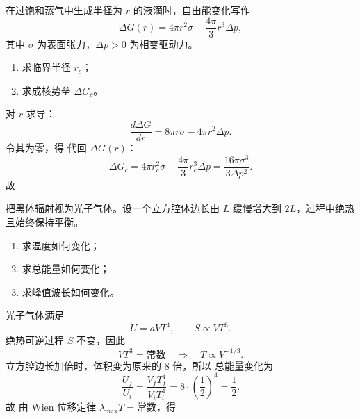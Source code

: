 \begin{question}
在过饱和蒸气中生成半径为 $r$ 的液滴时，自由能变化写作
\[
\Delta G(r)=4\pi r^2\sigma-\frac{4\pi}{3}r^3\Delta p,
\]
其中 $\sigma$ 为表面张力，$\Delta p>0$ 为相变驱动力。
\begin{enumerate}[label=（\arabic*）,leftmargin=2.8em,itemsep=0.2em]
\item 求临界半径 $r_c$；
\item 求成核势垒 $\Delta G_c$。
\end{enumerate}
\begin{solution}

对 $r$ 求导：
\[
\frac{d\Delta G}{dr}=8\pi r\sigma-4\pi r^2\Delta p.
\]
令其为零，得
代回 $\Delta G(r)$：
\[
\Delta G_c=4\pi r_c^2\sigma-\frac{4\pi}{3}r_c^3\Delta p
=\frac{16\pi\sigma^3}{3\Delta p^2}.
\]
故
\end{solution}
\end{question}

\begin{question}
把黑体辐射视为光子气体。设一个立方腔体边长由 $L$ 缓慢增大到 $2L$，过程中绝热且始终保持平衡。
\begin{enumerate}[label=（\arabic*）,leftmargin=2.8em,itemsep=0.2em]
\item 求温度如何变化；
\item 求总能量如何变化；
\item 求峰值波长如何变化。
\end{enumerate}
\begin{solution}

光子气体满足
\[
U=aVT^4,
\qquad S\propto VT^3.
\]
绝热可逆过程 $S$ 不变，因此
\[
VT^3=\text{常数}
\quad\Longrightarrow\quad
T\propto V^{-1/3}.
\]
立方腔边长加倍时，体积变为原来的 $8$ 倍，所以
总能量变化为
\[
\frac{U_f}{U_i}=\frac{V_fT_f^4}{V_iT_i^4}=8\cdot\left(\frac12\right)^4=\frac12.
\]
故
由 Wien 位移定律 $\lambda_{\max}T=\text{常数}$，得
\end{solution}
\end{question}

